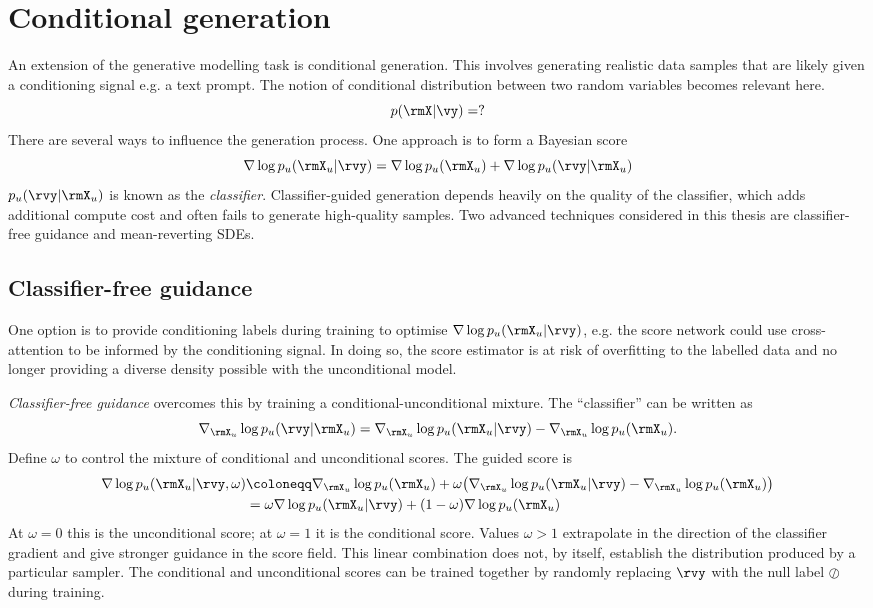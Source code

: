 \section{Conditional generation}
An extension of the generative modelling task is conditional generation. This involves generating realistic data samples that are likely given a conditioning signal e.g. a text prompt. The notion of conditional distribution between two random variables becomes relevant here.
\[
p(\rmX|\vy)=?
\]
There are several ways to influence the generation process. One approach is to form a Bayesian score
\[
\nabla\log p_u(\rmX_u|\rvy)=\nabla\log p_u(\rmX_u) + \nabla\log p_u(\rvy|\rmX_u)
\]
$p_u(\rvy|\rmX_u)$ is known as the \textit{classifier}. Classifier-guided generation depends heavily on the quality of the classifier, which adds additional compute cost and often fails to generate high-quality samples. Two advanced techniques considered in this thesis are classifier-free guidance and mean-reverting SDEs.
\subsection{Classifier-free guidance}
One option is to provide conditioning labels during training to optimise $\nabla\log p_u(\rmX_u|\rvy)$, e.g. the score network could use cross-attention to be informed by the conditioning signal. In doing so, the score estimator is at risk of overfitting to the labelled data and no longer providing a diverse density possible with the unconditional model.

\textit{Classifier-free guidance} overcomes this by training a conditional-unconditional mixture. The ``classifier'' can be written as
\[
\nabla_{\rmX_u}\log p_u(\rvy|\rmX_u) = \nabla_{\rmX_u}\log p_u(\rmX_u|\rvy) - \nabla_{\rmX_u}\log p_u(\rmX_u).
\]
Define $\omega$ to control the mixture of conditional and unconditional scores. The guided score is
\begin{align}
\nabla\log p_u(\rmX_u|\rvy,\omega)
&\coloneqq \nabla_{\rmX_u}\log p_u(\rmX_u) + \omega\bigl(\nabla_{\rmX_u}\log p_u(\rmX_u|\rvy) - \nabla_{\rmX_u}\log p_u(\rmX_u)\bigr) \\
&= \omega\nabla\log p_u(\rmX_u|\rvy) + (1-\omega)\nabla\log p_u(\rmX_u)
\end{align}
At $\omega=0$ this is the unconditional score; at $\omega=1$ it is the conditional score. Values $\omega>1$ extrapolate in the direction of the classifier gradient and give stronger guidance in the score field. This linear combination does not, by itself, establish the distribution produced by a particular sampler. The conditional and unconditional scores can be trained together by randomly replacing $\rvy$ with the null label $\oslash$ during training.

